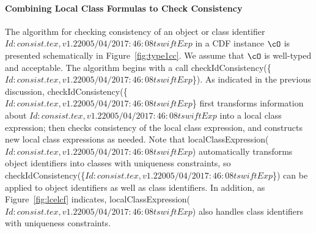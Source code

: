 \paragraph*{Combining Local Class Formulas to Check Consistency}
The algorithm for checking consistency of an object or class
identifier $Id: consist.tex,v 1.2 2005/04/20 17:46:08 tswift Exp $ in a CDF instance $\cO$ is presented schematically in
Figure~\ref{fig:type1cc}.  We assume that $\cO$ is well-typed and
acceptable.  The algorithm begins with a call {\sf
checkIdConsistency(\{$Id: consist.tex,v 1.2 2005/04/20 17:46:08 tswift Exp $\})}.  As indicated in the previous
discussion, {\sf checkIdConsistency(\{$Id: consist.tex,v 1.2 2005/04/20 17:46:08 tswift Exp $\}} first transforms
information about $Id: consist.tex,v 1.2 2005/04/20 17:46:08 tswift Exp $ into a local class expression; then checks
consistency of the local class expression, and constructs new local
class expressions as needed.  Note that {\sf
localClassExpression($Id: consist.tex,v 1.2 2005/04/20 17:46:08 tswift Exp $)} automatically transforms object
identifiers into classes with uniqueness constraints, so {\sf
checkIdConsistency(\{$Id: consist.tex,v 1.2 2005/04/20 17:46:08 tswift Exp $\})} can be applied to object identifiers as
well as class identifiers.  In addition, as Figure~\ref{fig:lcelcf}
indicates, {\sf localClassExpression($Id: consist.tex,v 1.2 2005/04/20 17:46:08 tswift Exp $)} also handles class
identifiers with uniqueness constraints.

